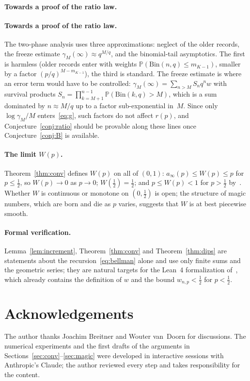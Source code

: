 \documentclass[11pt]{article}
\theoremstyle{definition}
\newcommand{\Bin}{\mathrm{Bin}}
\newcommand{\Prob}{\mathbb{P}}
\begin{document}
\paragraph{Towards a proof of the ratio law.}\paragraph{Towards a proof of the ratio law.}  The two-phase analysis
uses three approximations: neglect of the older records, the freeze
estimate $\gamma_M(\infty)\approx q^{M/q}$, and the binomial-tail
asymptotics.  The first is harmless (older records enter with weights
$\Prob(\Bin(n,q)\le m_{K-1})$, smaller by a factor $(p/q)^{M-m_{K-1}}$),
the third is standard.  The freeze estimate is where an error term
would have to be controlled: $\gamma_M(\infty)=\sum_{n>M}S_nq^{n}w$ with
survival products $S_n=\prod_{k=M+1}^{n-1}\Prob(\Bin(k,q)>M)$, which is
a sum dominated by $n\approx M/q$ up to a factor sub-exponential in~$M$.
Since only $\log\gamma_M/M$ enters~\eqref{eq:g}, such factors do not
affect $r(p)$, and Conjecture~\ref{conj:ratio} should be provable along
these lines once Conjecture~\ref{conj:B} is available.

\paragraph{The limit $W(p)$.}  Theorem~\ref{thm:conv} defines $W(p)$ on
all of $(0,1)$: $a_\infty(p)\le W(p)\le p$ for $p\le\tfrac12$, so
$W(p)\to0$ as $p\to0$; $W(\tfrac12)=\tfrac12$; and $p\le W(p)<1$ for
$p>\tfrac12$ by~\cite{Paper1}.  Whether $W$ is
continuous or monotone on $(0,\tfrac12)$ is open; the structure of magic
numbers, which are born and die as $p$ varies, suggests that $W$ is at
best piecewise smooth.

\paragraph{Formal verification.}  Lemma~\ref{lem:increment},
Theorem~\ref{thm:conv} and Theorem~\ref{thm:dips} are statements about
the recursion~\eqref{eq:bellman} alone and use only finite sums and
the geometric series; they are natural targets for the Lean~4
formalization of~\cite{Paper1}, which already contains the definition
of $w$ and the bound $w_{n,p}<\tfrac12$ for $p<\tfrac12$.

\section*{Acknowledgements}
The author thanks Joachim Breitner and Wouter van~Doorn for
discussions.  The numerical experiments and the first drafts of the
arguments in Sections~\ref{sec:conv}--\ref{sec:magic} were developed in
interactive sessions with Anthropic's Claude; the author reviewed every
step and takes responsibility for the content.
\end{document}
